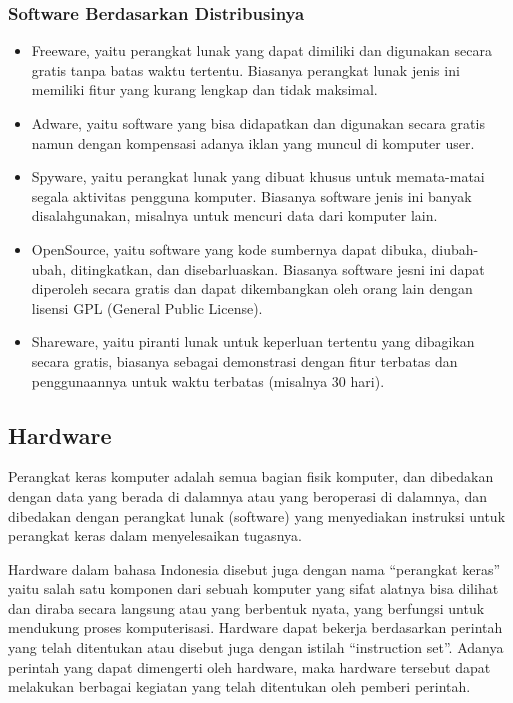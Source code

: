 \subsubsection{Software Berdasarkan Distribusinya}

\begin{itemize}
\item Freeware, yaitu perangkat lunak yang dapat dimiliki dan digunakan secara gratis tanpa batas waktu tertentu. Biasanya perangkat lunak jenis ini memiliki fitur yang kurang lengkap dan tidak maksimal.

\item Adware, yaitu software yang bisa didapatkan dan digunakan secara gratis namun dengan kompensasi adanya iklan yang muncul di komputer user.

\item Spyware, yaitu perangkat lunak yang dibuat khusus untuk memata-matai segala aktivitas pengguna komputer. Biasanya software jenis ini banyak disalahgunakan, misalnya untuk mencuri data dari komputer lain.

\item OpenSource, yaitu software yang kode sumbernya dapat dibuka, diubah-ubah, ditingkatkan, dan disebarluaskan. Biasanya software jesni ini dapat diperoleh secara gratis dan dapat dikembangkan oleh orang lain dengan lisensi GPL (General Public License).

\item Shareware, yaitu piranti lunak untuk keperluan tertentu yang dibagikan secara gratis, biasanya sebagai demonstrasi dengan fitur terbatas dan penggunaannya untuk waktu terbatas (misalnya 30 hari).

\end{itemize}

\subsection{Hardware}

Perangkat keras komputer adalah semua bagian fisik komputer, dan dibedakan dengan data yang berada di dalamnya atau yang beroperasi di dalamnya, dan dibedakan dengan perangkat lunak (software) yang menyediakan instruksi untuk perangkat keras dalam menyelesaikan tugasnya.

Hardware dalam bahasa Indonesia disebut juga dengan nama “perangkat keras” yaitu salah satu komponen dari sebuah komputer yang sifat alatnya bisa dilihat dan diraba secara langsung atau yang berbentuk nyata, yang berfungsi untuk mendukung proses komputerisasi. Hardware dapat bekerja berdasarkan perintah yang telah ditentukan atau disebut juga dengan istilah “instruction set”. Adanya perintah yang dapat dimengerti oleh hardware, maka hardware tersebut dapat melakukan berbagai kegiatan yang telah ditentukan oleh pemberi perintah.

